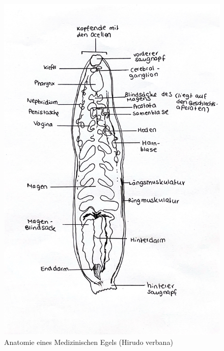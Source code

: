\documentclass[oneside,10pt,a4paper]{report}
\begin{document}
				\begin{figure}[H]
					\centering
					\includegraphics[scale=0.25]{Egel.JPG}
					\caption{Anatomie eines Medizinischen Egels (Hirudo verbana)}
					\label{fig:Egel_ana}
				\end{figure}
				
\end{document}
